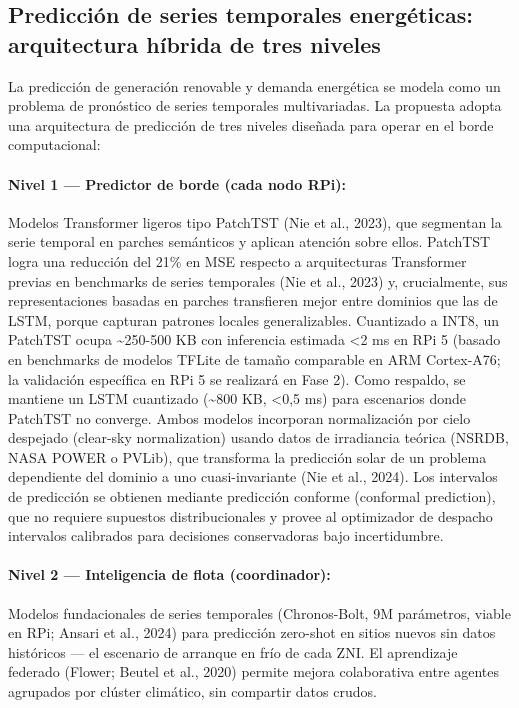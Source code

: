 \documentclass[12pt,letterpaper]{article}
\begin{document}
\subsection{Predicci\'on de series temporales energ\'eticas: arquitectura h\'ibrida de tres niveles}

La predicci\'on de generaci\'on renovable y demanda energ\'etica se modela como un problema de pron\'ostico de series temporales multivariadas. La propuesta adopta una arquitectura de predicci\'on de tres niveles dise\~nada para operar en el borde computacional:

\paragraph{Nivel 1 --- Predictor de borde (cada nodo RPi):}
Modelos Transformer ligeros tipo PatchTST (Nie et al., 2023), que segmentan la serie temporal en parches sem\'anticos y aplican atenci\'on sobre ellos. PatchTST logra una reducci\'on del 21\% en MSE respecto a arquitecturas Transformer previas en benchmarks de series temporales (Nie et al., 2023) y, crucialmente, sus representaciones basadas en parches transfieren mejor entre dominios que las de LSTM, porque capturan patrones locales generalizables. Cuantizado a INT8, un PatchTST ocupa \textasciitilde250-500 KB con inferencia estimada <2 ms en RPi 5 (basado en benchmarks de modelos TFLite de tama\~no comparable en ARM Cortex-A76; la validaci\'on espec\'ifica en RPi 5 se realizar\'a en Fase 2). Como respaldo, se mantiene un LSTM cuantizado (\textasciitilde800 KB, <0,5 ms) para escenarios donde PatchTST no converge. Ambos modelos incorporan normalizaci\'on por cielo despejado (clear-sky normalization) usando datos de irradiancia te\'orica (NSRDB, NASA POWER o PVLib), que transforma la predicci\'on solar de un problema dependiente del dominio a uno cuasi-invariante (Nie et al., 2024). Los intervalos de predicci\'on se obtienen mediante predicci\'on conforme (conformal prediction), que no requiere supuestos distribucionales y provee al optimizador de despacho intervalos calibrados para decisiones conservadoras bajo incertidumbre.

\paragraph{Nivel 2 --- Inteligencia de flota (coordinador):}
Modelos fundacionales de series temporales (Chronos-Bolt, 9M par\'ametros, viable en RPi; Ansari et al., 2024) para predicci\'on zero-shot en sitios nuevos sin datos hist\'oricos --- el escenario de arranque en fr\'io de cada ZNI. El aprendizaje federado (Flower; Beutel et al., 2020) permite mejora colaborativa entre agentes agrupados por cl\'uster clim\'atico, sin compartir datos crudos.
\end{document}
